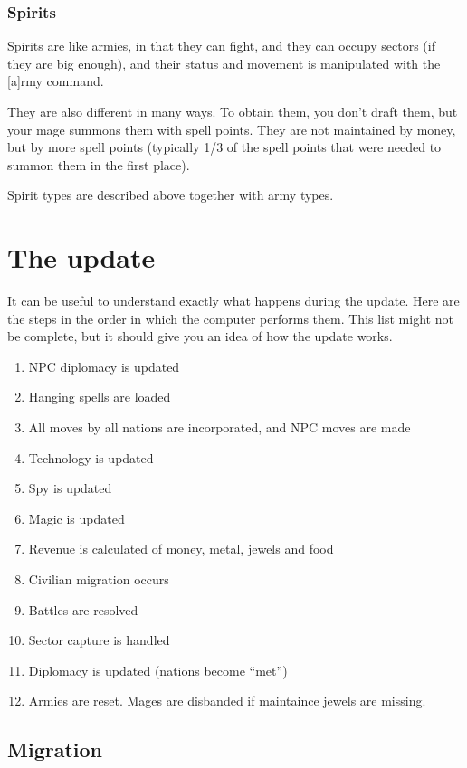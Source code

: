 \subsection{Spirits}
Spirits are like armies, in that they can fight, and they can occupy
sectors (if they are big enough), and their status and movement is
manipulated with the [a]rmy command.

They are also different in many ways.  To obtain them, you don't draft
them, but your mage summons them with spell points.  They are not
maintained by money, but by more spell points (typically 1/3 of the
spell points that were needed to summon them in the first place).

Spirit types are described above together with army types.

\chapter{The update}

It can be useful to understand exactly what happens during the update.
Here are the steps in the order in which the computer performs them.
This list might not be complete, but it should give you an idea of how
the update works.

\begin{enumerate}

\item NPC diplomacy is updated
\item Hanging spells are loaded
\item All moves by all nations are incorporated, and NPC moves are made
\item Technology is updated
\item Spy is updated
\item Magic is updated
\item Revenue is calculated of money, metal, jewels and food
\item Civilian migration occurs
\item Battles are resolved
\item Sector capture is handled
\item Diplomacy is updated (nations become ``met'')
\item Armies are reset.  Mages are disbanded if maintaince jewels are missing.

\end{enumerate}

\section{Migration}

